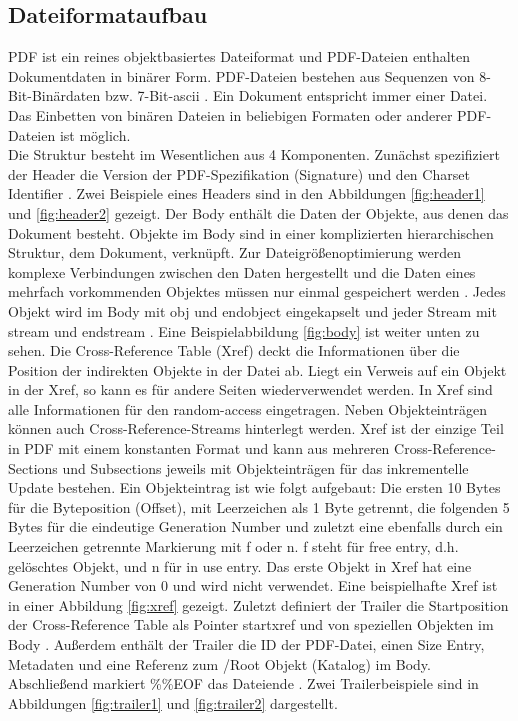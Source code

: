 \subsection{Dateiformataufbau}
PDF ist ein reines objektbasiertes Dateiformat und PDF-Dateien enthalten Dokumentdaten in binärer Form. PDF-Dateien bestehen aus Sequenzen von 8-Bit-Binärdaten bzw. 7-Bit-\gls{ascii} \cite{schneeberger}. Ein Dokument entspricht immer einer Datei. Das Einbetten von binären Dateien in beliebigen Formaten oder anderer PDF-Dateien ist möglich. \\
Die Struktur besteht im Wesentlichen aus 4 Komponenten. Zunächst spezifiziert der Header die Version der PDF-Spezifikation (Signature) und den Charset Identifier \cite{ccc-pdf-secrets}. Zwei Beispiele eines Headers sind in den Abbildungen \ref{fig:header1} und \ref{fig:header2} gezeigt. Der Body enthält die Daten der Objekte, aus denen das Dokument besteht. Objekte im Body sind in einer komplizierten hierarchischen Struktur, dem Dokument, verknüpft. Zur Dateigrößenoptimierung werden komplexe Verbindungen zwischen den Daten hergestellt und die Daten eines mehrfach vorkommenden Objektes müssen nur einmal gespeichert werden \cite{softx}. Jedes Objekt wird im Body mit obj und endobject eingekapselt und jeder Stream mit stream und endstream \cite{schneeberger}. Eine Beispielabbildung \ref{fig:body} ist weiter unten zu sehen. Die Cross-Reference Table (Xref) deckt die Informationen über die Position der indirekten Objekte in der Datei ab. Liegt ein Verweis auf ein Objekt in der Xref, so kann es für andere Seiten wiederverwendet werden. In Xref sind alle Informationen für den random-access eingetragen. Neben Objekteinträgen können auch Cross-Reference-Streams hinterlegt werden. Xref ist der einzige Teil in PDF mit einem konstanten Format und kann aus mehreren Cross-Reference-Sections und Subsections jeweils mit Objekteinträgen für das inkrementelle Update bestehen. Ein Objekteintrag ist wie folgt aufgebaut: Die ersten 10 Bytes für die Byteposition (Offset), mit Leerzeichen als 1 Byte getrennt, die folgenden 5 Bytes für die eindeutige Generation Number und zuletzt eine ebenfalls durch ein Leerzeichen getrennte Markierung mit f oder n. f steht für free entry, d.h. gelöschtes Objekt, und n für in use entry. Das erste Objekt in Xref hat eine Generation Number von 0 und wird nicht verwendet. Eine beispielhafte Xref ist in einer Abbildung \ref{fig:xref} gezeigt. Zuletzt definiert der Trailer die Startposition der Cross-Reference Table als Pointer startxref und von speziellen Objekten im Body \cite{ccc-break-pdf}.  Außerdem enthält der Trailer die ID der PDF-Datei, einen Size Entry, Metadaten und eine Referenz zum /Root Objekt (Katalog) im Body. Abschließend markiert \%\%EOF das Dateiende \cite{ccc-break-pdf, ccc-pdf-secrets}. Zwei Trailerbeispiele sind in Abbildungen \ref{fig:trailer1} und \ref{fig:trailer2} dargestellt.
